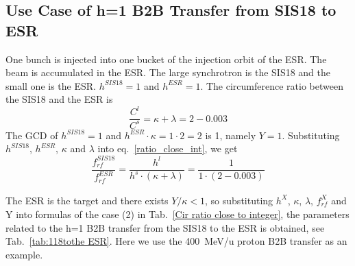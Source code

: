 \subsection{Use Case of h=1 B2B Transfer from SIS18 to ESR} 
One bunch is injected into one bucket of the injection orbit of the ESR. The beam is accumulated in the ESR. The large synchrotron is the SIS18 and the small one is the ESR. $h^{\mathit{SIS18}}=1$ and $h^{\mathit{ESR}}=1$. The circumference ratio between the SIS18 and the ESR is
\begin{equation}
\frac{C^l}{C^s}=\kappa + \lambda =2-0.003
\end{equation}
The GCD of $h^{\mathit{SIS18}}=1$ and $h^{\mathit{ESR}}\cdot \kappa=1\cdot 2=2$ is 1, namely $Y=1$. Substituting $h^{\mathit{SIS18}}$, $h^{\mathit{ESR}}$, $\kappa$ and $\lambda$ into eq.~\ref{ratio_close_int}, we get
\begin{equation}
\frac {f_{\mathit{rf}}^{\mathit{SIS18}}}{f_{\mathit{rf}}^{\mathit{ESR}}}= \frac{h^l}{h^s \cdot (\kappa+ \lambda)}=\frac {1}{1 \cdot(2-0.003)}
\end{equation}

The ESR is the target and there exists $Y/\kappa<1$, so substituting $h^X$, $\kappa$, $\lambda$, $f_{\mathit{rf}}^{X}$ and Y into formulas of the case (2) in Tab.~\ref{Cir ratio close to integer}, the parameters related to the h=1 B2B transfer from the SIS18 to the ESR is obtained, see Tab.~\ref{tab:118tothe ESR}. Here we use the \SI{400}{MeV/\atomicmassunit} proton B2B transfer as an example. 

